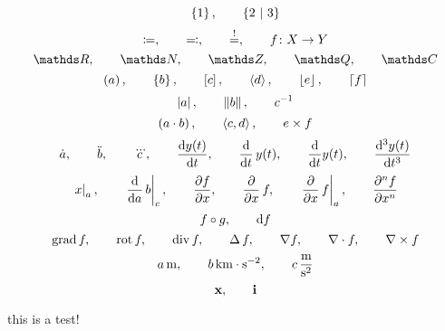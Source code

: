 \documentclass[a4paper,fleqn, 11pt]{article}
\begin{document}
  \[
    \set{1}{}
    \separate
    \set{2}{3}
  \]
  \[
    \coloneqq
    ,\qquad
    \eqqcolon
    ,\qquad
    \stackrel{!}{=}
    ,\qquad
    f\colon X\to Y
  \]
  \[
    \setReal
    \separate
    \setNatural
    \separate
    \setInteger
    \separate
    \setRational
    \separate
    \setComplex
  \]
  \[
    \left( a \right)
    ,\qquad
    \left\{ b \right\}
    ,\qquad
    \left[ c \right]
    ,\qquad
    \left\langle d \right\rangle
    ,\qquad
    \left\lfloor e \right\rfloor
    ,\qquad
    \left\lceil f \right\rceil
  \]
  \[
    \left| a \right|
    ,\qquad
    \left\| b \right\|
    ,\qquad
    {c}^{-1}
  \]
  \[
    \left( a\cdot b \right)
    ,\qquad
    \left\langle c,d \right\rangle
    ,\qquad
    e \times f
  \]
  \[
    \timeDerivative{a}
    \separate
    \timeSecondDerivative{b}
    \separate
    \timeThirdDerivative{c}
    \separate
    \leibnizDerivative{y(t)}{t}
    \separate
    \leibnizDerivativeOperator{t}{y(t)}
    \separate
    \leibnizDerivativeOperator{t}{}y(t)
    \separate
    \leibnizDerivative[3]{y(t)}{t}
  \]
  \[
    \appendValue{x}{a}
    \separate
    \leibnizDerivativeOperatorValue{a}{b}{c}
    \separate
    \leibnizPartialDerivative{f}{x}
    \separate
    \leibnizPartialDerivativeOperator{x}{f}
    \separate
    \leibnizPartialDerivativeOperatorValue{x}{f}{a}
    \separate
    \leibnizPartialDerivative[n]{f}{x}
  \]
  \[
    f\circ g
    ,\qquad
    \mathrm{d} f
  \]
  \[
      \operatorname{grad} f
      ,\qquad
      \operatorname{rot} f
      ,\qquad
      \operatorname{div} f
      ,\qquad
      \operatorname{\Delta} f
      ,\qquad
      \nabla f
      ,\qquad
      \nabla\cdot f
      ,\qquad
      \nabla\times f
  \]
  \[
    a\, \mathrm{m}
    ,\qquad
    b\, \mathrm{km\cdot s^{-2}}
    ,\qquad
    c\, \mathrm{\frac{m}{s^2}}
  \]
  \begin{equation}
 	\mathbf{x}
  	,\qquad
  	\mathbf{i}
  \end{equation}
  \begin{atiTask}
  	this is a test!
  \end{atiTask}
\end{document}
